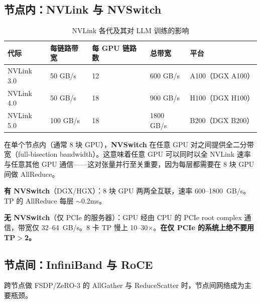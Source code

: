 \subsection{节点内：NVLink 与 NVSwitch}
\label{intra-node-nvlink-and-nvswitch}

\begin{table}[ht!]
\centering\small
\caption{NVLink 各代及其对 LLM 训练的影响}
\begin{tabular}{@{}l l l l l@{}}
\toprule
\textbf{代际} & \textbf{每链路带宽} & \textbf{每 GPU 链路数} & \textbf{总带宽} & \textbf{平台} \\
\midrule
NVLink 3.0 & 50 GB/s & 12 & 600 GB/s & A100（DGX A100） \\
NVLink 4.0 & 50 GB/s & 18 & 900 GB/s & H100（DGX H100） \\
NVLink 5.0 & 100 GB/s & 18 & 1800 GB/s & B200（DGX B200） \\
\bottomrule
\end{tabular}
\end{table}

在单个节点内（通常 8 块 GPU），\textbf{NVSwitch} 在任意 GPU 对之间提供全二分带宽（full-bisection bandwidth）。这意味着任意 GPU 可以同时以全 NVLink 速率与任意其他 GPU 通信——这对张量并行至关重要，因为每层都需要在 8 块 GPU 间做 AllReduce。

\begin{keybox}
\textbf{有 NVSwitch}（DGX/HGX）：8 块 GPU 两两全互联，速率 600--1800~GB/s。TP 的 AllReduce 每层 $\sim$0.2ms。

\textbf{无 NVSwitch}（仅 PCIe 的服务器）：GPU 经由 CPU 的 PCIe root complex 通信，带宽仅 32--64~GB/s。8 卡 TP 慢上 10--30$\times$。\textbf{在仅 PCIe 的系统上绝不要用 TP$>$2。}
\end{keybox}

\subsection{节点间：InfiniBand 与 RoCE}
\label{inter-node-infiniband-and-roce}

跨节点做 FSDP/ZeRO-3 的 AllGather 与 ReduceScatter 时，节点间网络成为主要瓶颈。

